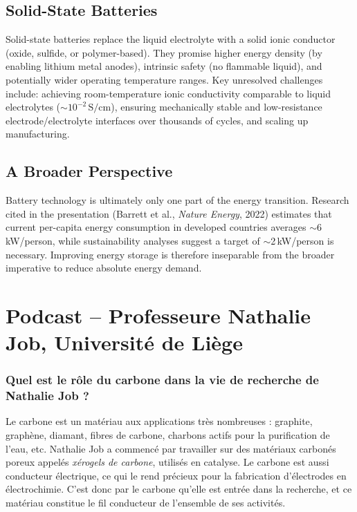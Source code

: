 \subsection{Solid-State Batteries}

Solid-state batteries replace the liquid electrolyte with a solid ionic conductor (oxide, sulfide, or polymer-based). They promise higher energy density (by enabling lithium metal anodes), intrinsic safety (no flammable liquid), and potentially wider operating temperature ranges. Key unresolved challenges include: achieving room-temperature ionic conductivity comparable to liquid electrolytes ($\sim 10^{-2}\,\text{S/cm}$), ensuring mechanically stable and low-resistance electrode/electrolyte interfaces over thousands of cycles, and scaling up manufacturing.

\subsection{A Broader Perspective}

Battery technology is ultimately only one part of the energy transition. Research cited in the presentation (Barrett et al., \textit{Nature Energy}, 2022) estimates that current per-capita energy consumption in developed countries averages $\sim$6\,kW/person, while sustainability analyses suggest a target of $\sim$2\,kW/person is necessary. Improving energy storage is therefore inseparable from the broader imperative to reduce absolute energy demand.




\section{Podcast -- Professeure Nathalie Job, Université de Liège}

\subsubsection{Quel est le rôle du carbone dans la vie de recherche de Nathalie Job ?}

Le carbone est un matériau aux applications très nombreuses : graphite, graphène, diamant, fibres de carbone, charbons actifs pour la purification de l'eau, etc. Nathalie Job a commencé par travailler sur des matériaux carbonés poreux appelés \textit{xérogels de carbone}, utilisés en catalyse. Le carbone est aussi conducteur électrique, ce qui le rend précieux pour la fabrication d'électrodes en électrochimie. C'est donc par le carbone qu'elle est entrée dans la recherche, et ce matériau constitue le fil conducteur de l'ensemble de ses activités.

